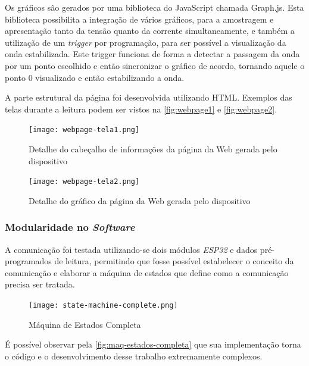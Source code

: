 
Os gráficos são gerados por uma biblioteca do JavaScript chamada Graph.js. Esta biblioteca possibilita a integração de vários gráficos, para a amostragem e apresentação tanto da tensão quanto da corrente simultaneamente, e também a utilização de um \textit{trigger} por programação, para ser possível a visualização da onda estabilizada. Este trigger funciona de forma a detectar a passagem da onda por um ponto escolhido e então sincronizar o gráfico de acordo, tornando aquele o ponto 0 visualizado e então estabilizando a onda.

A parte estrutural da página foi desenvolvida utilizando \gls{HTML}. Exemplos das telas durante a leitura podem ser vistos na \autoref{fig:webpage1} e \autoref{fig:webpage2}.

\begin{figure}[h!]
    \centering
    \caption{Detalhe do cabeçalho de informações da página da Web gerada pelo dispositivo}
    \vspace*{5mm}
    \texttt{[image: webpage-tela1.png]}
    \label{fig:webpage1}
    \fonte{}
\end{figure}

\begin{figure}[h!]
    \centering
    \caption{Detalhe do gráfico da página da Web gerada pelo dispositivo}
    \vspace*{5mm}
    \texttt{[image: webpage-tela2.png]}
    \label{fig:webpage2}
    \fonte{}
\end{figure}

\subsubsection{Modularidade no \textit{Software}}\label{modular-softw}

A comunicação foi testada utilizando-se dois módulos \textit{ESP32} e dados pré-programados de leitura, permitindo que fosse possível estabelecer o conceito da comunicação e elaborar a máquina de estados que define como a comunicação precisa ser tratada.

\begin{figure}[h!]
    \centering
    \caption{Máquina de Estados Completa}
    \vspace*{5mm}
    \texttt{[image: state-machine-complete.png]}
    \label{fig:maq-estados-completa}
    \fonte{}
\end{figure}

É possível observar pela \autoref{fig:maq-estados-completa} que sua implementação torna o código e o desenvolvimento desse trabalho extremamente complexos.

